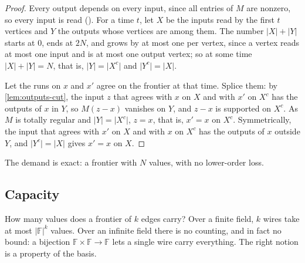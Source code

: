 \documentclass[11pt]{article}
\newcommand{\leanrefs}[1]{{\unskip\nobreak\hfil\penalty50\hskip1em\null\nobreak\hfil
  {\normalfont\small #1}\parfillskip=0pt\finalhyphendemerits=0\par}}
\newcommand{\leanref}[1]{\leanrefs{\lean{#1}}}
\theoremstyle{plain}
\theoremstyle{definition}
\theoremstyle{remark}
\newcommand{\F}{\mathbb{F}}
\newcommand{\card}[1]{\lvert #1\rvert}
\begin{document}

\begin{proof}
Every output depends on every input, since all entries of $M$ are nonzero, so every input is
read (). For a time $t$, let $X$ be the inputs read by
the first $t$ vertices and $Y$ the outputs whose vertices are among them. The number
$\card X + \card Y$ starts at $0$, ends at $2N$, and grows by at most one per vertex, since a
vertex reads at most one input and is at most one output vertex; so at some time
$\card X + \card Y = N$, that is, $\card Y = \card{X^c}$ and $\card{Y^c} = \card X$.

Let the runs on $x$ and $x'$ agree on the frontier at that time. Splice them: by
\cref{lem:outputs-cut}, the input $z$ that agrees with $x$ on $X$ and with $x'$ on $X^c$ has
the outputs of $x$ in $Y$, so $M(z - x)$ vanishes on $Y$, and $z - x$ is supported on $X^c$.
As $M$ is totally regular and $\card Y = \card{X^c}$, $z = x$, that is, $x' = x$ on $X^c$.
Symmetrically, the input that agrees with $x'$ on $X$ and with $x$ on $X^c$ has the outputs of
$x$ outside $Y$, and $\card{Y^c} = \card X$ gives $x' = x$ on $X$.
\end{proof}

The demand is exact: a frontier with $N$ values, with no lower-order loss.

\subsection{Capacity}

How many values does a frontier of $k$ edges carry? Over a finite field, $k$ wires take at most
$\card\F^k$ values. Over an infinite field there is no counting, and in fact no bound: a
bijection $\F \times \F \to \F$ lets a single wire carry everything. The right notion is a
property of the basis.

\end{document}
